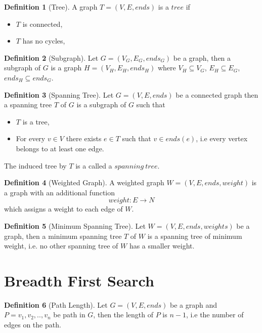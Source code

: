 \documentclass{report}
\theoremstyle{plain}
\theoremstyle{definition}
\newtheorem{definition}{Definition}
\theoremstyle{remark}
\begin{document}
\begin{definition}[Tree]
A graph $T = (V, E, ends)$ is a $tree$ if
\begin{itemize}
\item $T$ is connected,
\item $T$ has no cycles,
\end{itemize}
\end{definition}

\begin{definition}[Subgraph]
Let $G = (V_G, E_G, ends_G)$ be a graph, then a subgraph of $G$ is a graph $H = (V_H, E_H, ends_H)$ where $V_H \subseteq V_G$, $E_H \subseteq E_G$, $ends_H \subseteq ends_G$.
\end{definition}

\begin{definition}[Spanning Tree]
Let $G = (V, E, ends)$ be a connected graph then a spanning tree $T$ of $G$ is a subgraph of $G$ such that
\begin{itemize}
\item $T$ is a tree,
\item For every $v \in V$ there exists $e \in T$ such that $v \in ends(e)$, i.e every vertex belongs to at least one edge.
\end{itemize}
The induced tree by $T$ is a called a $spanning \  tree$.
\end{definition}

\begin{definition}[Weighted Graph]
A weighted graph $W = (V, E, ends, weight)$ is a graph with an additional function
  \begin{equation}
  weight:E\to N
  \end{equation}
which assigns a weight to each edge of $W$.
\end{definition}

\begin{definition}[Minimum Spanning Tree]
Let $W = (V, E, ends, weights)$ be a graph, then a minimum spanning tree $T$ of $W$ is a spanning tree of minimum weight, i.e. no other spanning tree of $W$ has a smaller weight.
\end{definition}

\section*{Breadth First Search}

\begin{definition}[Path Length]
Let $G = (V, E, ends)$ be a graph and $P=v_1,v_2,..,v_n$ be path in $G$, then the length of $P$ is $n-1$, i.e the number of edges on the path. 
\end{definition}
\end{document}
